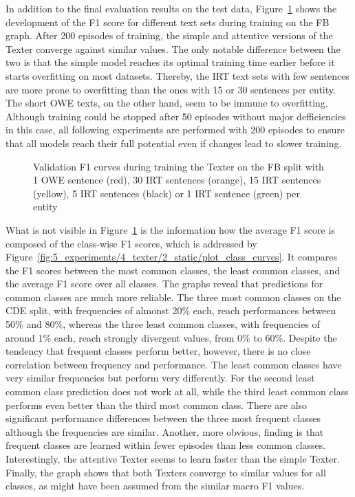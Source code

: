 In addition to the final evaluation results on the test data, Figure~\ref{fig:5_experiments/4_texter/2_static/plot_valid_curves} shows the development of the F1 score for different text sets during training on the FB graph. After 200 episodes of training, the simple and attentive versions of the Texter converge against similar values. The only notable difference between the two is that the simple model reaches its optimal training time earlier before it starts overfitting on most datasets. Thereby, the IRT text sets with few sentences are more prone to overfitting than the ones with 15 or 30 sentences per entity. The short OWE texts, on the other hand, seem to be immune to overfitting. Although training could be stopped after 50 episodes without major defficiencies in this case, all following experiments are performed with 200 episodes to ensure that all models reach their full potential even if changes lead to slower training.

\begin{figure}[t]
    \centering
    
    \caption{Validation F1 curves during training the Texter on the FB split with 1 OWE sentence (red), 30 IRT sentences (orange), 15 IRT sentences (yellow), 5 IRT sentences (black) or 1 IRT sentence (green) per entity}
    \label{fig:5_experiments/4_texter/2_static/plot_valid_curves}
\end{figure}

What is not visible in Figure~\ref{fig:5_experiments/4_texter/2_static/plot_valid_curves} is the information how the average F1 score is composed of the class-wise F1 scores, which is addressed by Figure~\ref{fig:5_experiments/4_texter/2_static/plot_class_curves}. It compares the F1 scores between the most common classes, the least common classes, and the average F1 score over all classes. The graphs reveal that predictions for common classes are much more reliable. The three most common classes on the CDE split, with frequencies of almonst 20\% each, reach performances between 50\% and 80\%, whereas the three least common classes, with frequencies of around 1\% each, reach strongly divergent values, from 0\% to 60\%. Despite the tendency that frequent classes perform better, however, there is no close correlation between frequency and performance. The least common classes have very similar frequencies but perform very differently. For the second least common class prediction does not work at all, while the third least common class performs even better than the third most common class. There are also significant performance differences between the three most frequent classes although the frequencies are similar. Another, more obvious, finding is that frequent classes are learned within fewer episodes than less common classes. Interestingly, the attentive Texter seems to learn faster than the simple Texter. Finally, the graph shows that both Texters converge to similar values for all classes, as might have been assumed from the similar macro F1 values.

